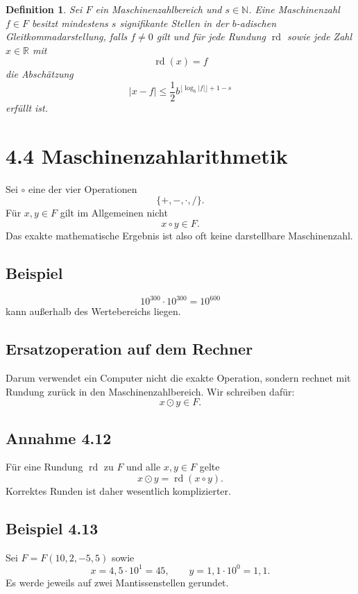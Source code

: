 \documentclass{article}
\newcommand{\R}{\mathbb{R}}
\newcommand{\N}{\mathbb{N}}
\newtheorem{defn}[thm]{Definition}
\begin{document}
\begin{defn}
Sei \(F\) ein Maschinenzahlbereich und \(s\in\N\). Eine Maschinenzahl \(f\in F\) besitzt mindestens \(s\) signifikante Stellen in der \(b\)-adischen Gleitkommadarstellung, falls \(f\neq 0\) gilt und für jede Rundung \(\operatorname{rd}\) sowie jede Zahl \(x\in\R\) mit
\[
\operatorname{rd}(x)=f
\]
die Abschätzung
\[
|x-f|
\leq
\frac12 b^{\lfloor\log_b |f|\rfloor+1-s}
\]
erfüllt ist.
\end{defn}

\section{4.4 Maschinenzahlarithmetik}

Sei \(\circ\) eine der vier Operationen
\[
\{+,-,\cdot,/\}.
\]
Für \(x,y\in F\) gilt im Allgemeinen nicht
\[
x\circ y\in F.
\]
Das exakte mathematische Ergebnis ist also oft keine darstellbare Maschinenzahl.

\subsection*{Beispiel}

\[
10^{300}\cdot 10^{300}=10^{600}
\]
kann außerhalb des Wertebereichs liegen.

\subsection*{Ersatzoperation auf dem Rechner}

Darum verwendet ein Computer nicht die exakte Operation, sondern rechnet mit Rundung zurück in den Maschinenzahlbereich. Wir schreiben dafür:
\[
x\odot y\in F.
\]

\subsection*{Annahme 4.12}

Für eine Rundung \(\operatorname{rd}\) zu \(F\) und alle \(x,y\in F\) gelte
\[
x\odot y=\operatorname{rd}(x\circ y).
\]
Korrektes Runden ist daher wesentlich komplizierter.

\subsection*{Beispiel 4.13}

Sei \(F=F(10,2,-5,5)\) sowie
\[
x=4{,}5\cdot 10^1=45,
\qquad
y=1{,}1\cdot 10^0=1{,}1.
\]
Es werde jeweils auf zwei Mantissenstellen gerundet.
\end{document}
